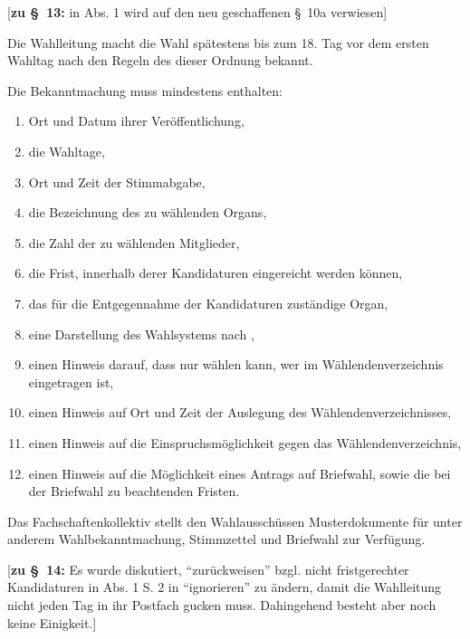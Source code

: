 \documentclass[%
draft,%
multilinesections%
]{fswo}
\newcommand\bemFr[1] {{\color{Red}[#1]}}
\newcommand\bemFr[1]{}%
\begin{document}
\bemFr{\textbf{zu \S~13:} in Abs. 1 wird auf den neu geschaffenen \S~10a verwiesen}
\begin{contract}
Die Wahlleitung macht die Wahl spätestens bis zum 18. Tag vor dem ersten Wahltag nach den Regeln des  dieser Ordnung bekannt.

Die Bekanntmachung muss mindestens enthalten: \label{cls-wahlbekanntmachung:abs-inhalt}
\begin{enumerate}
\item Ort und Datum ihrer Veröffentlichung,
\item die Wahltage, \label{cls-wahlbekanntmachung:wahltage}
\item Ort und Zeit der Stimmabgabe,
\item die Bezeichnung des zu wählenden Organs,
\item die Zahl der zu wählenden Mitglieder,
\item die Frist, innerhalb derer Kandidaturen eingereicht werden können,
\item das für die Entgegennahme der Kandidaturen zuständige Organ,
\item eine Darstellung des Wahlsystems nach ,
\item einen Hinweis darauf, dass nur wählen kann, wer im Wählendenverzeichnis eingetragen ist,
\item einen Hinweis auf Ort und Zeit der Auslegung des Wählendenverzeichnisses,
\item einen Hinweis auf die Einspruchsmöglichkeit gegen das Wählendenverzeichnis,
\item einen Hinweis auf die Möglichkeit eines Antrags auf Briefwahl, sowie die bei der Briefwahl zu beachtenden Fristen.
\end{enumerate}

Das Fachschaftenkollektiv stellt den Wahlausschüssen Musterdokumente für unter anderem Wahlbekanntmachung, Stimmzettel und Briefwahl zur Verfügung.
\end{contract}

\bemFr{\textbf{zu \S~14:} Es wurde diskutiert, \enquote{zurückweisen} bzgl. nicht fristgerechter Kandidaturen in Abs. 1 S. 2 in \enquote{ignorieren} zu ändern, damit die Wahlleitung nicht jeden Tag in ihr Postfach gucken muss.
Dahingehend besteht aber noch keine Einigkeit.}
\end{document}
